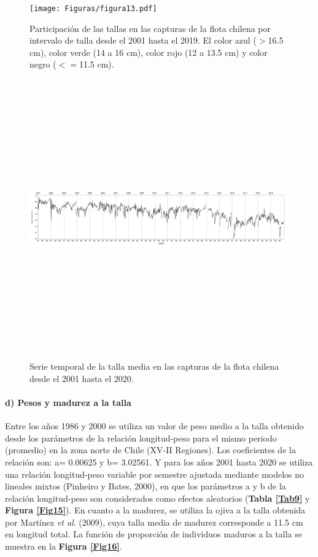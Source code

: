 \documentclass[letter,11pt]{article}
\begin{document}
\vspace{0.5cm}
\begin{figure}[htb!]
 \centering
 \texttt{[image: Figuras/figura13.pdf]}
 \caption{Participaci\'on de las tallas en las capturas de la flota chilena por intervalo de talla desde el 2001 hasta el 2019. El color azul ($>$16.5 cm), color verde (14 a 16 cm), color rojo (12 a 13.5 cm) y color negro ($<=$11.5 cm).}
 \label{Fig13}
\end{figure}

\vspace{0.5cm}
\begin{figure}[htb!]
 \centering
 \includegraphics[width=16.5cm,height=12cm]{Figuras/figura14.pdf}
 \caption{Serie temporal de la talla media en las capturas de la flota chilena desde el 2001 hasta el 2020.}
 \label{Fig14}
\end{figure}


\paragraph{d) Pesos y madurez a la talla}

\quad

Entre los a\~{n}os 1986 y 2000 se utiliza un valor de peso medio a la talla
obtenido desde los par\'ametros de la relaci\'on longitud-peso para el
mismo periodo (promedio) en la zona norte de Chile (XV-II Regiones). Los
coeficientes de la relaci\'on son: a= 0.00625 y b= 3.02561. Y para los
a\~{n}os 2001 hasta 2020 se utiliza una relaci\'on longitud-peso variable por
semestre ajustada mediante modelos no lineales mixtos (Pinheiro y Bates,
2000), en que los par\'ametros a y b de la relaci\'on longitud-peso son
considerados como efectos aleatorios (\textbf{Tabla \ref{Tab9}} y
\textbf{Figura \ref{Fig15}}). En cuanto a la madurez, se utiliza la
ojiva a la talla obtenida por Mart\'inez \textit{et al}. (2009), cuya
talla media de madurez corresponde a 11.5 cm en longitud total. La
funci\'on de proporci\'on de individuos maduros a la talla se muestra en la
\textbf{Figura \ref{Fig16}}.
\end{document}
